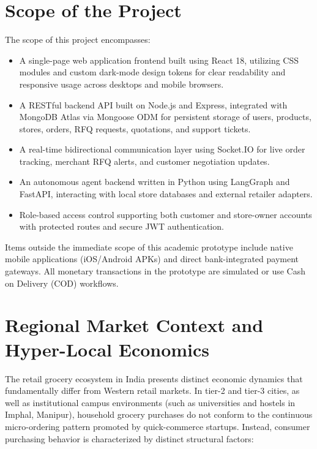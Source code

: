 \section{Scope of the Project}

The scope of this project encompasses:
\begin{itemize}
    \item A single-page web application frontend built using React 18, utilizing CSS modules and custom dark-mode design tokens for clear readability and responsive usage across desktops and mobile browsers.
    \item A RESTful backend API built on Node.js and Express, integrated with MongoDB Atlas via Mongoose ODM for persistent storage of users, products, stores, orders, RFQ requests, quotations, and support tickets.
    \item A real-time bidirectional communication layer using Socket.IO for live order tracking, merchant RFQ alerts, and customer negotiation updates.
    \item An autonomous agent backend written in Python using LangGraph and FastAPI, interacting with local store databases and external retailer adapters.
    \item Role-based access control supporting both customer and store-owner accounts with protected routes and secure JWT authentication.
\end{itemize}

Items outside the immediate scope of this academic prototype include native mobile applications (iOS/Android APKs) and direct bank-integrated payment gateways. All monetary transactions in the prototype are simulated or use Cash on Delivery (COD) workflows.

\section{Regional Market Context and Hyper-Local Economics}

The retail grocery ecosystem in India presents distinct economic dynamics that fundamentally differ from Western retail markets. In tier-2 and tier-3 cities, as well as institutional campus environments (such as universities and hostels in Imphal, Manipur), household grocery purchases do not conform to the continuous micro-ordering pattern promoted by quick-commerce startups. Instead, consumer purchasing behavior is characterized by distinct structural factors:


